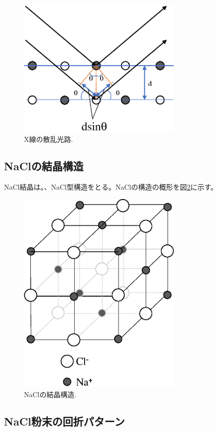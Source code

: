 \documentclass[11pt,a4j,uplatex]{jsarticle}
\begin{document}
\begin{figure}[htb]
 \centering
 \includegraphics[clip,width=8cm]{dsinq.eps}
 \caption{X線の散乱光路.}
 \label{dsinq}
\end{figure}

\newpage
\subsection{NaClの結晶構造}
NaCl結晶は。、NaCl型構造をとる。NaClの構造の概形を図\ref{nacl}に示す。

\begin{figure}[htb]
 \centering
 \includegraphics[clip,width=8cm]{nacl.eps}
 \caption{NaClの結晶構造.}
 \label{nacl}
\end{figure}

\newpage
\subsection{NaCl粉末の回折パターン}
\end{document}
